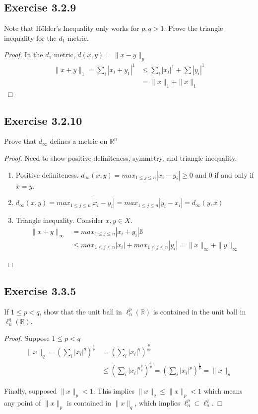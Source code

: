\documentclass{tufte-book}
\theoremstyle{mytheoremstyle}
\theoremstyle{mylemstyle}
\theoremstyle{mydefstyle}
\begin{document}
\subsection{Exercise 3.2.9}
Note that H{\"o}lder's Inequality only works for $p,q > 1$.  Prove the triangle inequality for the $d_1$ metric.

\begin{proof}
In the $d_1$ metric, $d(x,y) = \|x-y\|_p$
\begin{align*}
 \|x+y\|_1 = \sum_i|x_i+y_1|^1 &\leq \sum_i|x_i|^1 + \sum|y_i|^1 \\
 &= \|x\|_1 + \|x\|_1
\end{align*}
\end{proof}

\subsection{Exercise 3.2.10}
Prove that $d_\infty$ defines a metric on $\mathbb{R}^n$
\begin{proof}
Need to show positive definiteness, symmetry, and triangle inequality.
\begin{enumerate}
\item Positive definiteness. $d_\infty(x,y) = max_{1\leq j\leq n}|x_i-y_i| \geq 0$ and $0$ if and only if $x = y$.

\item $d_\infty(x,y) = max_{1\leq j\leq n}|x_i-y_i| =  max_{1\leq j\leq n}|y_i-x_i| =  d_\infty(y,x)$

\item Triangle inequality.  Consider $x, y \in X$.
\begin{align*}
\|x+y\|_\infty &= max_{1\leq j\leq n}|x_i+y_i|ß \\
&\leq max_{1\leq j\leq n}|x_i| + max_{1\leq j\leq n}|y_i| = \|x\|_\infty + \|y\|_\infty
\end{align*}
\end{enumerate}

\end{proof}

\subsection{Exercise 3.3.5}
If $1 \leq p < q$, show that the unit ball in $\ell_n^p(\mathbb{R})$ is contained in the unit ball in $\ell_n^q(\mathbb{R})$.
\begin{proof}
Suppose $1 \leq p < q$
\begin{align*}
\|x\|_q = (\sum_i|x_i|^q)^{\frac{1}{q}} &= (\sum_i|x_i|^q)^{\frac{p}{qp}} \\
&\leq (\sum_i|x_i|^{q\frac{p}{q}})^{\frac{1}{p}} = (\sum_i|x_i|^p)^{\frac{1}{p}} = \|x\|_p
\end{align*}

Finally, supposed $\|x\|_p < 1$.  This implies $\|x\|_q \leq \|x\|_p < 1$ which means any point of $\|x\|_p$ is contained in $\|x\|_q$, which implies $\ell_n^p \subset \ell^q_n$. 

\end{proof}
\end{document}
